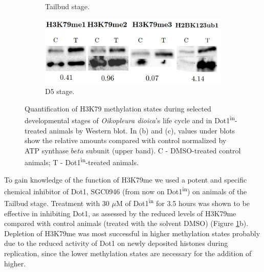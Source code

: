 \documentclass[11pt,twoside,a4paper]{report}
\begin{document}
\begin{figure}[h!]
\begin{subfigure}{.5\textwidth}
			\caption{Tailbud stage.}
		\end{subfigure}
		\begin{subfigure}{.7\textwidth}
			\centering
			\includegraphics[width=1\linewidth]{pngs/D5_Dot1_in.png}
			\caption{D5 stage.}
		\end{subfigure}
		\caption[H3K79 methylation states during selected developmental stages of \textit{Oikopleura} and in Dot1\textsuperscript{in}-treated animals]
		{Quantification of H3K79 methylation states during selected developmental stages of \textit{Oikopleura dioica}'s life cycle and in Dot1\textsuperscript{in}-treated animals by Western blot.
			{\footnotesize
				In (b) and (c), values under blots show the relative amounts compared with control normalized by ATP synthase $beta$ subunit (upper band). C - DMSO-treated control animals; T - Dot1\textsuperscript{in}-treated animals.
			}
		}
		\label{fig:k79me}
	\end{figure}
	
	To gain knowledge of the function of H3K79me we used a potent and specific chemical inhibitor of Dot1, SGC0946 (from now on Dot1\textsuperscript{in}) \cite{Yu2012} on animals of the Tailbud stage. Treatment with 30 $\mu$M of Dot1\textsuperscript{in} for 3.5 hours was shown to be effective in inhibiting Dot1, as assessed by the reduced levels of H3K79me compared with control animals (treated with the solvent DMSO) (Figure \ref{fig:k79me}b). Depletion of H3K79me was most successful in higher methylation states probably due to the reduced activity of Dot1 on newly deposited histones during replication, since the lower methylation states are necessary for the addition of higher.
	
\end{document}
